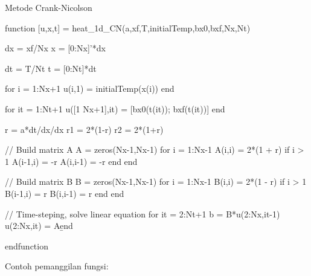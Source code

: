 \documentclass[10pt,bahasa]{article}
\begin{document}
Metode Crank-Nicolson

\begin{scilabcode}
function [u,x,t] = heat_1d_CN(a,xf,T,initialTemp,bx0,bxf,Nx,Nt)
  
  dx = xf/Nx
  x  = [0:Nx]'*dx
    
  dt = T/Nt
  t  = [0:Nt]*dt
  
  for i = 1:Nx+1
    u(i,1) = initialTemp(x(i))
  end
  
  for it = 1:Nt+1
    u([1 Nx+1],it) = [bx0(t(it)); bxf(t(it))]
  end
  
  r  = a*dt/dx/dx
  r1 = 2*(1-r)
  r2 = 2*(1+r)
  
  // Build matrix A
  A = zeros(Nx-1,Nx-1)
  for i = 1:Nx-1
    A(i,i) = 2*(1 + r)
    if i > 1
      A(i-1,i) = -r
      A(i,i-1) = -r
    end
  end
  
  // Build matrix B
  B = zeros(Nx-1,Nx-1)
  for i = 1:Nx-1
    B(i,i) = 2*(1 - r)
    if i > 1
      B(i-1,i) = r
      B(i,i-1) = r
    end
  end

  // Time-steping, solve linear equation
  for it = 2:Nt+1
    b = B*u(2:Nx,it-1)
    u(2:Nx,it) = A\b
  end
  
  endfunction  
\end{scilabcode}

Contoh pemanggilan fungsi:
\end{document}
